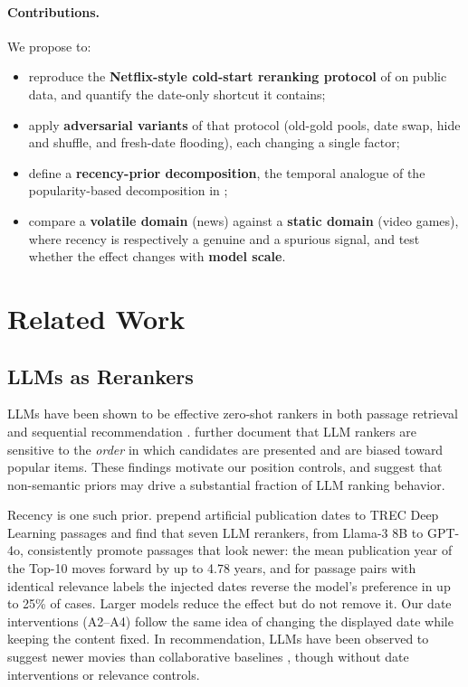 \documentclass[11pt]{article}
\begin{document}
\paragraph{Contributions.} We propose to:
\begin{itemize}
  \item reproduce the \textbf{Netflix-style cold-start reranking protocol} of \citet{li2026llmreasoning} on public data, and quantify the date-only shortcut it contains;
  \item apply \textbf{adversarial variants} of that protocol (old-gold pools, date swap, hide and shuffle, and fresh-date flooding), each changing a single factor;
  \item define a \textbf{recency-prior decomposition}, the temporal analogue of the popularity-based decomposition in \citet{dong2026diagnosing};
  \item compare a \textbf{volatile domain} (news) against a \textbf{static domain} (video games), where recency is respectively a genuine and a spurious signal, and test whether the effect changes with \textbf{model scale}.
\end{itemize}

\section{Related Work}

\subsection{LLMs as Rerankers}
LLMs have been shown to be effective zero-shot rankers in both passage retrieval \citep{sun2023rankgpt} and sequential recommendation \citep{hou2024llmrank}. \citet{hou2024llmrank} further document that LLM rankers are sensitive to the \emph{order} in which candidates are presented and are biased toward popular items. These findings motivate our position controls, and suggest that non-semantic priors may drive a substantial fraction of LLM ranking behavior.

Recency is one such prior. \citet{fang2025recency} prepend artificial publication dates to TREC Deep Learning passages and find that seven LLM rerankers, from Llama-3 8B to GPT-4o, consistently promote passages that look newer: the mean publication year of the Top-10 moves forward by up to 4.78 years, and for passage pairs with identical relevance labels the injected dates reverse the model's preference in up to 25\% of cases. Larger models reduce the effect but do not remove it. Our date interventions (A2--A4) follow the same idea of changing the displayed date while keeping the content fixed. In recommendation, LLMs have been observed to suggest newer movies than collaborative baselines \citep{deldjoo2024chatgptbias, eberhard2024narrative}, though without date interventions or relevance controls.
\end{document}
